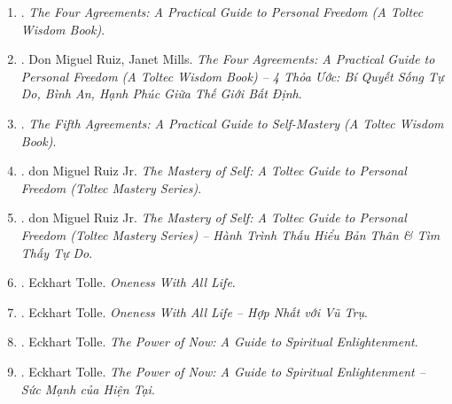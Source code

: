 \documentclass{article}
\begin{document}
\begin{enumerate}
\begin{itemize}
\begin{quotation}
			{\it``By constantly saying yes to everyone else we are inadvertently saying no to ourselves.''}
			
			-- Bằng cách liên tục nói có với người khác, chúng ta đang vô tình nói không với chính mình.
			
			{\it``The best way to help the world is to help yourself 1st, not by sacrificing yourself.''}
			
			-- Cách tốt nhất để giúp đỡ thế giới là giúp đỡ chính mình trước tiên chứ không phải bằng cách hy sinh bản thân.
		\end{quotation}
	\end{itemize}
	
	\item \cite{Ruiz_4_agreements}. {\it The Four Agreements: A Practical Guide to Personal Freedom (A Toltec Wisdom Book)}.\hfill{\sf[done]}
	
	\item \cite{Ruiz_Mills_4_agreements_VN}. Don Miguel Ruiz, Janet Mills. {\it The Four Agreements: A Practical Guide to Personal Freedom (A Toltec Wisdom Book) -- 4 Thỏa Ước: Bí Quyết Sống Tự Do, Bình An, Hạnh Phúc Giữa Thế Giới Bất Định}.\hfill{\sf[done]}
	
	\item \cite{Ruiz_Ruiz_5th_agreement}. {\it The Fifth Agreements: A Practical Guide to Self-Mastery (A Toltec Wisdom Book)}.\hfill{\sf[done]}
	
	\item \cite{Ruiz_mastery_self}. {\sc don Miguel Ruiz Jr.} {\it The Mastery of Self: A Toltec Guide to Personal Freedom (Toltec Mastery Series)}.
	
	\item \cite{Ruiz_mastery_self_VN}. {\sc don Miguel Ruiz Jr.} {\it The Mastery of Self: A Toltec Guide to Personal Freedom (Toltec Mastery Series) -- Hành Trình Thấu Hiểu Bản Thân \& Tìm Thấy Tự Do}.\hfill{\sf[done]}
	
	\item \cite{Tolle_oneness}. {\sc Eckhart Tolle}. {\it Oneness With All Life}.
	
	\item \cite{Tolle_oneness_VN}. {\sc Eckhart Tolle}. {\it Oneness With All Life -- Hợp Nhất với Vũ Trụ}.\hfill{\sf[done]}
	
	\item \cite{Tolle_now}. {\sc Eckhart Tolle}. {\it The Power of Now: A Guide to Spiritual Enlightenment}.
	
	\item \cite{Tolle_now_VN}. {\sc Eckhart Tolle}. {\it The Power of Now: A Guide to Spiritual Enlightenment -- Sức Mạnh của Hiện Tại}.\hfill{\sf[done]}
	

\end{enumerate}
\end{document}
